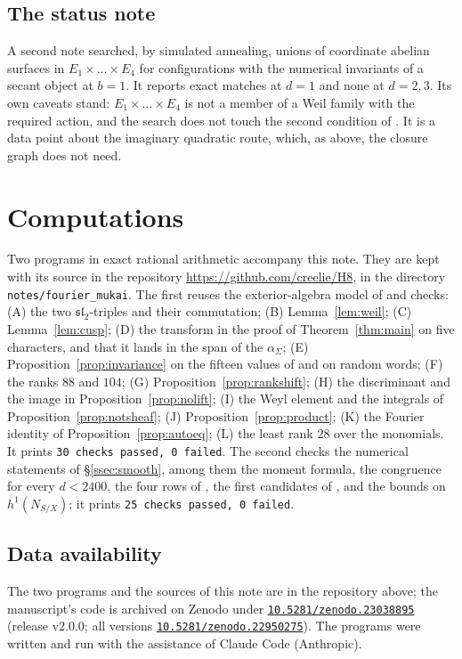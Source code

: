 \documentclass[11pt]{amsart}
\theoremstyle{definition}
\theoremstyle{remark}
\begin{document}
\subsection{The status note}\label{ssec:statusnote}
A second note searched, by simulated annealing, unions of coordinate abelian
surfaces in $E_{1}\times\dots\times E_{4}$ for configurations with the
numerical invariants of a secant object at $b=1$. It reports exact matches at
$d=1$ and none at $d=2,3$. Its own caveats stand: $E_{1}\times\dots\times
E_{4}$ is not a member of a Weil family with the required action, and the
search does not touch the second condition of \cite[Theorem~18.29]{BMB}. It is
a data point about the imaginary quadratic route, which, as above, the closure
graph does not need.

\section{Computations}\label{sec:computations}

Two programs in exact rational arithmetic accompany this note. They are
kept with its source in the repository \url{https://github.com/creelie/H8},
in the directory \texttt{notes/fourier\_mukai}. The first reuses the exterior-algebra
model of \cite[item (LXV)]{BMB} and checks: (A) the two
$\mathfrak{sl}_{2}$-triples and their commutation; (B)
Lemma~\ref{lem:weil}; (C) Lemma~\ref{lem:cusp}; (D) the transform in the
proof of Theorem~\ref{thm:main} on five characters, and that it lands in the
span of the $\alpha_{\Sigma}$; (E) Proposition~\ref{prop:invariance} on the
fifteen values of \cite[Theorem~19.22]{BMB} and on random words; (F) the ranks
$88$ and $104$; (G) Proposition~\ref{prop:rankshift}; (H) the discriminant and
the image in Proposition~\ref{prop:nolift}; (I) the Weyl element and the
integrals of Proposition~\ref{prop:notsheaf}; (J)
Proposition~\ref{prop:product}; (K) the Fourier identity of
Proposition~\ref{prop:autoeq}; (L) the least rank $28$ over the monomials. It
prints \texttt{30 checks passed, 0 failed}. The second checks the numerical
statements of \S\ref{ssec:smooth}, among them the moment formula, the
congruence for every $d<2400$, the four rows of \cite[Table~3]{BMB}, the first
candidates of \cite[Table~4]{BMB}, and the bounds on $h^{1}(N_{S/X})$; it
prints \texttt{25 checks passed, 0 failed}.

\subsection*{Data availability}
The two programs and the sources of this note are in the repository above;
the manuscript's code is archived on Zenodo under
\href{https://doi.org/10.5281/zenodo.23038895}{\texttt{10.5281/zenodo.23038895}}
(release v2.0.0; all versions
\href{https://doi.org/10.5281/zenodo.22950275}{\texttt{10.5281/zenodo.22950275}}).
The programs were written and run with the assistance of Claude Code
(Anthropic).
\end{document}
